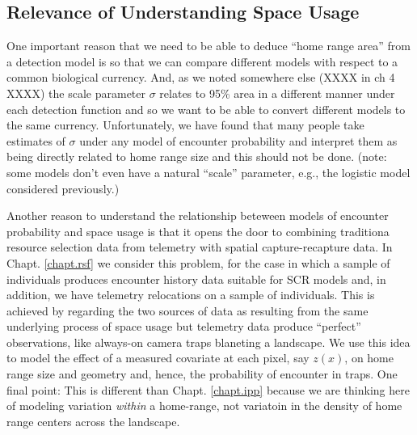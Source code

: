 \subsection{Relevance of Understanding Space Usage}

One important reason that we need to be able to deduce ``home range
area'' from a detection model is so that we can compare different
models with respect to a common biological currency. And, 
as we noted somewhere else (XXXX in ch 4 XXXX) the scale parameter $\sigma$
relates to 95\% area in a different manner under each detection
function and so we want to be able to convert different models to the
same currency. Unfortunately, we have found that many people take
estimates of $\sigma$ under any model of encounter probability and
interpret them as being directly related to home range size and this
should not be done. (note:
some models don't even have a natural ``scale'' parameter, e.g., the
logistic model considered previously.)

Another reason to understand the relationship beteween models of
encounter probability and space usage is that it opens the door to
combining traditiona resource selection data from telemetry with
spatial capture-recapture data.  In Chapt. \ref{chapt.rsf} we consider
this problem, for the case in which a sample of individuals produces
encounter history data suitable for SCR models and, in addition, we
have telemetry relocations on a sample of individuals. This is
achieved by regarding the two sources of data as resulting from the
same underlying process of space usage but telemetry data produce
``perfect'' observations, like always-on camera traps blaneting a
landscape.  We use this idea to model the effect of a measured
covariate at each pixel, say $z(x)$, on home range size and geometry
and, hence, the probability of encounter in traps.  One final point:
This is different than Chapt. \ref{chapt.ipp} because we are thinking
here of modeling variation {\it within} a home-range, not variatoin in
the density of home range centers across the landscape.



